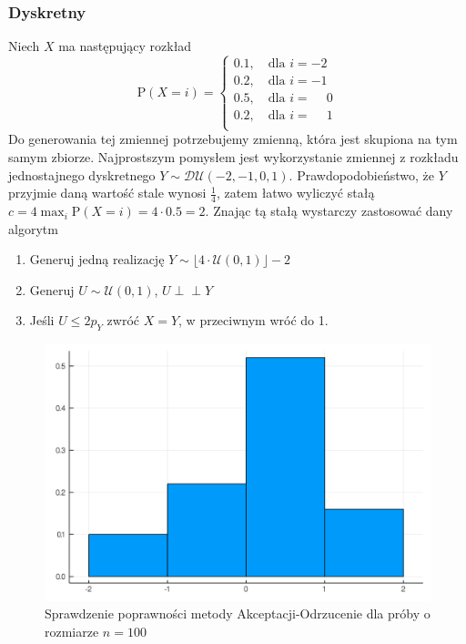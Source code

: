 \documentclass[12pt]{mwrep}
\newcommand{\indep}{\perp \!\!\! \perp}
\begin{document}
	\subsubsection{Dyskretny}
	Niech $X$ ma następujący rozkład
	\begin{equation}
		\mathrm{P}(X=i)=\begin{cases}
			0.1, \quad\text{dla $i=-2$}\\
			0.2, \quad\text{dla $i=-1$}\\
			0.5, \quad\text{dla $i=\phantom{-}0$}\\
			0.2, \quad\text{dla $i=\phantom{-}1$}\\
		\end{cases}
	\end{equation}
	Do generowania tej zmiennej potrzebujemy zmienną, która jest skupiona na tym samym zbiorze. Najprostszym pomysłem jest wykorzystanie zmiennej z rozkładu jednostajnego dyskretnego $Y\sim\mathcal{DU}(-2,-1,0,1)$. Prawdopodobieństwo, że $Y$ przyjmie daną wartość stale wynosi $\frac{1}{4}$, zatem łatwo wyliczyć stałą $c=4\max_i\mathrm{P}(X=i)=4\cdot0.5=2$. Znając tą stałą wystarczy zastosować dany algorytm
	\begin{enumerate}[leftmargin=10mm]
		\item Generuj jedną realizację $Y\sim\lfloor4\cdot\mathcal{U}(0,1)\rfloor-2$
		\item Generuj $U\sim \mathcal{U}(0,1)$, $U\indep Y$
		\item Jeśli $U\leqslant2p_Y$ zwróć $X=Y$, w przeciwnym wróć do 1.
	\end{enumerate}
	\begin{figure}[H]\caption{Sprawdzenie poprawności metody Akceptacji-Odrzucenie dla próby o rozmiarze $n=100$}\label{fig:AO_dysk}
		\includegraphics[width=\columnwidth]{fig/fig_AO_dysk.png}
	\end{figure}
	
\end{document}
